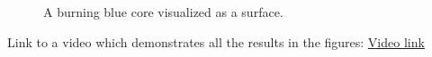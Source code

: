 \begin{figure}[h!]
\centering
{}
\caption
{
\label{fig:fire5}
A burning blue core visualized as a surface.
}
\end{figure}       

Link to a video which demonstrates all the results in the figures:
\href{http://youtu.be/F40\_rowaLQg}{Video link}


